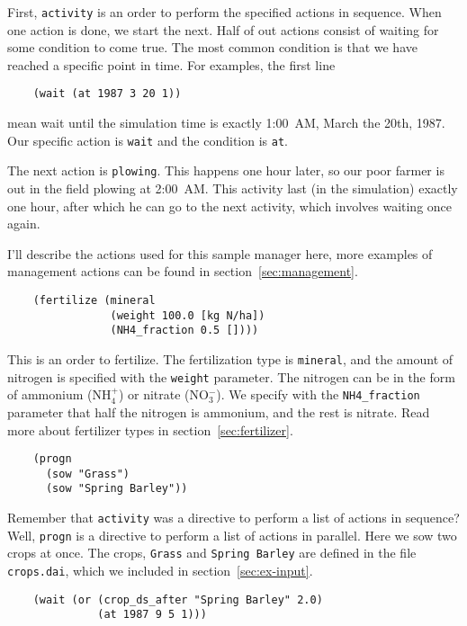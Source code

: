 \documentclass[a4paper,11pt]{article}
\begin{document}
First, \texttt{activity} is an order to perform the specified actions
in sequence.  When one action is done, we start the next.  Half of out
actions consist of waiting for some condition to come true.  The most
common condition is that we have reached a specific point in time.
For examples, the first line

\begin{verbatim}
    (wait (at 1987 3 20 1))
\end{verbatim}

mean wait until the simulation time is exactly 1:00~AM, March the
20th, 1987.  Our specific action is \texttt{wait} and the condition is
\texttt{at}.

The next action is \texttt{plowing}.  This happens one hour later, so
our poor farmer is out in the field plowing at 2:00~AM\@.  This activity
last (in the simulation) exactly one hour, after which he can go to
the next activity, which involves waiting once again.

I'll describe the actions used for this sample manager here, more
examples of management actions can be found in
section~\ref{sec:management}.

\begin{verbatim}
    (fertilize (mineral
                (weight 100.0 [kg N/ha])
                (NH4_fraction 0.5 [])))
\end{verbatim}

This is an order to fertilize.  The fertilization type is
\texttt{mineral}, and the amount of nitrogen is specified with the
\texttt{weight} parameter.  The nitrogen can be in the form of
ammonium (NH$_4^+$) or nitrate (NO$_3^-$).  We specify with the
\texttt{NH4\_fraction } parameter that half the nitrogen is ammonium,
and the rest is nitrate.  Read more about fertilizer types in
section~\ref{sec:fertilizer}.

\begin{verbatim}
    (progn
      (sow "Grass")
      (sow "Spring Barley"))
\end{verbatim}

Remember that \texttt{activity} was a directive to perform a list of
actions in sequence?  Well, \texttt{progn} is a directive to perform a
list of actions in parallel.  Here we sow two crops at once.  The
crops, \texttt{Grass} and \texttt{Spring Barley} are defined in the
file \texttt{crops.dai}, which we included in
section~\ref{sec:ex-input}.

\begin{verbatim}
    (wait (or (crop_ds_after "Spring Barley" 2.0)
              (at 1987 9 5 1)))
\end{verbatim}
\end{document}
